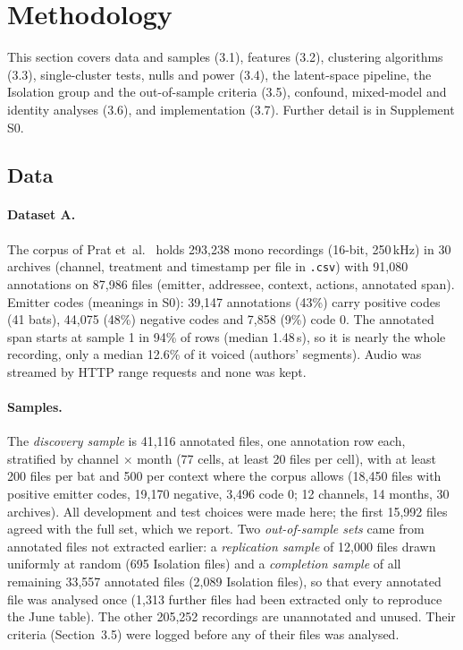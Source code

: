 \section{Methodology}
This section covers data and samples (3.1), features (3.2), clustering algorithms (3.3), single-cluster tests, nulls and power (3.4), the latent-space pipeline, the Isolation group and the out-of-sample criteria (3.5), confound, mixed-model and identity analyses (3.6), and implementation (3.7). Further detail is in Supplement S0.

\subsection{Data}
\paragraph{Dataset A.} The corpus of Prat et~al.\ \cite{prat2017} holds 293,238 mono recordings (16-bit, 250\,kHz) in 30 archives (channel, treatment and timestamp per file in \sd{}\texttt{.csv}) with 91,080 annotations on 87,986 files (emitter, addressee, context, actions, annotated span). Emitter codes (meanings in S0): 39,147 annotations (43\%) carry positive codes (41 bats), 44,075 (48\%) negative codes and 7,858 (9\%) code 0. The annotated span starts at sample 1 in 94\% of rows (median 1.48\,s), so it is nearly the whole recording, only a median 12.6\% of it voiced (authors' segments). Audio was streamed by HTTP range requests and none was kept.

\paragraph{Samples.} The \emph{discovery sample} is 41,116 annotated files, one annotation row each, stratified by channel $\times$ month (77 cells, at least 20 files per cell), with at least 200 files per bat and 500 per context where the corpus allows (18,450 files with positive emitter codes, 19,170 negative, 3,496 code 0; 12 channels, 14 months, 30 archives). All development and test choices were made here; the first 15,992 files agreed with the full set, which we report. Two \emph{out-of-sample sets} came from annotated files not extracted earlier: a \emph{replication sample} of 12,000 files drawn uniformly at random (695 Isolation files) and a \emph{completion sample} of all remaining 33,557 annotated files (2,089 Isolation files), so that every annotated file was analysed once (1,313 further files had been extracted only to reproduce the June table). The other 205,252 recordings are unannotated and unused. Their criteria (Section~3.5) were logged before any of their files was analysed.

